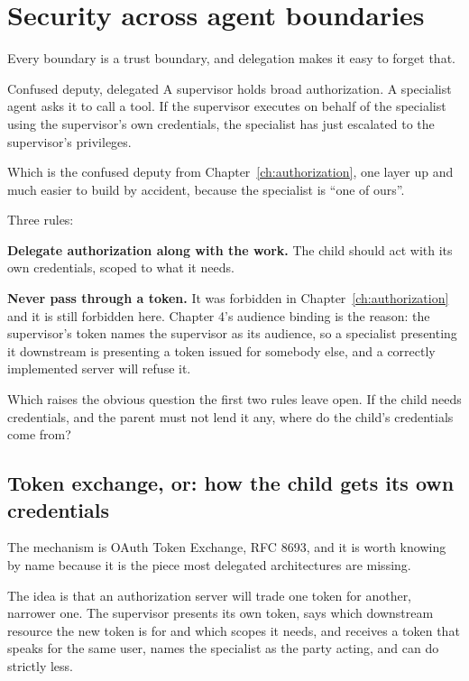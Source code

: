 \section{Security across agent boundaries}

Every boundary is a trust boundary, and delegation makes it easy to forget that.

\begin{dangerbox}{Confused deputy, delegated}
A supervisor holds broad authorization. A specialist agent asks it to call a
tool. If the supervisor executes on behalf of the specialist using the
supervisor's own credentials, the specialist has just escalated to the
supervisor's privileges.

Which is the confused deputy from Chapter~\ref{ch:authorization}, one layer up
and much easier to build by accident, because the specialist is ``one of ours''.
\end{dangerbox}

Three rules:

\textbf{Delegate authorization along with the work.} The child should act with
its own credentials, scoped to what it needs.

\textbf{Never pass through a token.} It was forbidden in
Chapter~\ref{ch:authorization} and it is still forbidden here. Chapter 4's
audience binding is the reason: the supervisor's token names the supervisor as
its audience, so a specialist presenting it downstream is presenting a token
issued for somebody else, and a correctly implemented server will refuse it.

Which raises the obvious question the first two rules leave open. If the child
needs credentials, and the parent must not lend it any, where do the child's
credentials come from?

\subsection{Token exchange, or: how the child gets its own credentials}

The mechanism is OAuth Token Exchange, RFC 8693, and it is worth knowing by name
because it is the piece most delegated architectures are missing.

The idea is that an authorization server will trade one token for another,
narrower one. The supervisor presents its own token, says which downstream
resource the new token is for and which scopes it needs, and receives a token
that speaks for the same user, names the specialist as the party acting, and can
do strictly less.

